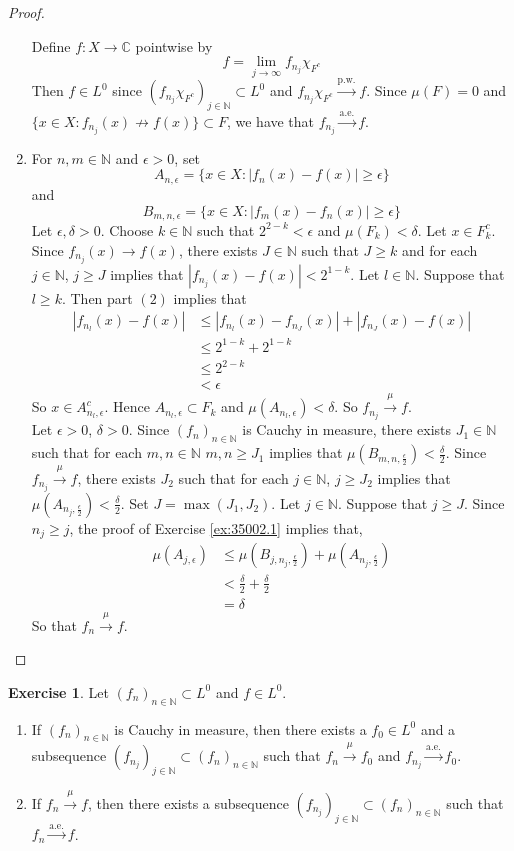 \documentclass{book}
\theoremstyle{definition}
\newtheorem{ex}[definition]{Exercise}
\newcommand{\del}{\delta}
\newcommand{\ep}{\epsilon}
\newcommand{\C}{\mathbb{C}}
\newcommand{\N}{\mathbb{N}}
\newcommand{\lex}[1]{\label{ex:#1}}
\newcommand{\rex}[1]{Exercise \ref{ex:#1}}
\DeclareMathOperator*{\0}{\mbf{0}}
\DeclareMathOperator*{\1}{\mbf{1}}
\newcommand{\convt}[1]{\xrightarrow{\text{#1}}}
\newcommand{\conv}[1]{\xrightarrow{#1}}
\begin{document}
\begin{proof}
\begin{enumerate}
	Define $f: X \rightarrow \C$ pointwise by $$f = \lim_{j \rightarrow \infty}f_{n_j}\chi_{F^c} $$
	Then $f \in L^0$ since $(f_{n_j}\chi_{F^c})_{j \in \N} \subset L^0$ and $f_{n_j}\chi_{F^c} \convt{p.w.} f$. Since $\mu(F) = 0$ and $\{x \in X: f_{n_j}(x) \not \rightarrow f(x)\} \subset F$, we have that $f_{n_j} \convt{a.e.} f$.\\
	\item For $n,m \in \N$ and $\ep >0$, set 
	$$A_{n, \ep} = \{x \in X: |f_n(x) - f(x) |\geq \ep \}$$ 
	and 
	$$B_{m, n, \ep} = \{x \in X: |f_m(x) - f_n(x)| \geq \ep\}$$ 
	Let $\ep, \del>0$. Choose $k \in \N$ such that $2^{2-k} < \ep$ and $\mu(F_k) < \del$. Let $x \in F_k^c$. Since $f_{n_j}(x) \rightarrow f(x)$, there exists $J \in \N$ such that $J \geq k$ and for each $j \in \N$, $j \geq J$ implies that $|f_{n_j}(x) - f(x)| < 2^{1-k}$. Let $l \in \N$. Suppose that $l \geq k$. Then part $(2)$ implies that
	\begin{align*}
	|f_{n_l}(x) - f(x)| 
	& \leq |f_{n_l}(x) - f_{n_J}(x)| + |f_{n_J}(x) - f(x)| \\
	&\leq 2^{1-k} + 2^{1-k}  \\
	&\leq 2^{2-k} \\
	&< \ep
	\end{align*}
	So $x \in A_{n_l, \ep}^c$. Hence $A_{n_l, \ep} \subset F_k$ and $\mu(A_{n_l, \ep}) < \del$. So $f_{n_j} \conv{\mu} f$. \\
	Let $\ep >0$, $\del > 0$. Since $(f_n)_{n \in \N}$ is Cauchy in measure, there exists $J_1 \in \N$ such that for each $m,n \in \N$ $m,n \geq J_1$ implies that $\mu(B_{m,n, \frac{\ep}{2}}) < \frac{\del}{2}$. Since $f_{n_j} \conv{\mu} f$, there exists $J_2$ such that for each $j \in \N$, $j \geq J_2$ implies that $\mu(A_{n_j, \frac{\ep}{2}}) < \frac{\del}{2}$. Set $J = \max(J_1, J_2)$. Let $j \in \N$. Suppose that $j \geq J$. Since $n_j \geq j$, the proof of \rex{35002.1} implies that, 
	\begin{align*}
	\mu(A_{j, \ep}) 
	&\leq \mu(B_{j, n_j, \frac{\ep}{2}}) + \mu(A_{n_j, \frac{\ep}{2}}) \\
	&< \frac{\del}{2} + \frac{\del}{2} \\
	&= \del
\end{align*}		
	So that $f_n \conv{\mu} f$.
	\end{enumerate}
	\end{proof}
	
	\begin{ex} \lex{35003.1} 
		Let $(f_n)_{n \in \N} \subset L^0$ and $f \in L^0$. 
		\begin{enumerate}
			\item If $(f_n)_{n \in \N}$ is Cauchy in measure, then there exists a $f_0 \in L^0$ and a subsequence $(f_{n_j})_{j \in \N} \subset (f_n)_{n \in \N}$ such that $f_n \conv{\mu} f_0$ and $f_{n_j} \convt{a.e.} f_0$.
			\item If $f_n \conv{\mu} f$, then there exists a subsequence $(f_{n_j})_{j \in \N} \subset (f_n)_{n \in \N}$ such that $f_n \convt{a.e.} f$.
		\end{enumerate}
	\end{ex}
	
\end{document}
